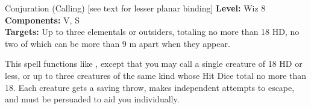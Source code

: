 {Conjuration (Calling) [see text for lesser planar binding]}
{
	\textbf{Level:}
	Wiz 8\\
	\textbf{Components:}
	V, S\\
	\textbf{Targets:}
	Up to three elementals or outsiders, totaling no more than 18 HD, no two of which can be more than 9 m apart when they appear.\\
}
{
	This spell functions like , except that you may call a single creature of 18 HD or less, or up to three creatures of the same kind whose Hit Dice total no more than 18. Each creature gets a saving throw, makes independent attempts to escape, and must be persuaded to aid you individually.

}

